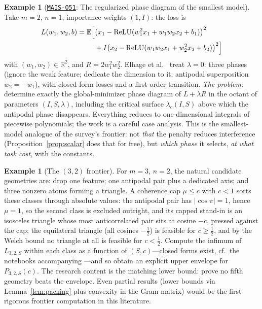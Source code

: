 \documentclass[11pt]{amsart}
\newcommand{\Oid}[1]{\href{https://github.com/lionellevine/MAIS/blob/main/open-problems/MAIS-O#1.md}{\texttt{MAIS-O#1}}}
\theoremstyle{plain}
\theoremstyle{definition}
\newtheorem{example}[theorem]{Example}
\DeclareMathOperator{\relu}{ReLU}
\newcommand{\E}{\mathbb{E}}
\newcommand{\R}{\mathbb{R}}
\begin{document}
\begin{example}[\Oid{51}: The regularized phase diagram of the smallest model]\label{ex:21}
Take $m=2$, $n=1$, importance weights $(1,I)$: the loss is
\begin{align*}
L(w_1,w_2,b) = \E\Bigl[&\bigl(x_1-\relu(w_1^2x_1+w_1w_2x_2+b_1)\bigr)^2\\
&+ I\bigl(x_2-\relu(w_1w_2x_1+w_2^2x_2+b_2)\bigr)^2\Bigr]
\end{align*}
with $(w_1,w_2)\in\R^2$, and $R = 2w_1^2w_2^2$. Elhage et al.~\cite{elhage2022} treat $\lambda=0$: three phases (ignore the weak feature; dedicate the dimension to it; antipodal superposition $w_2=-w_1$), with closed-form losses and a first-order transition. \emph{The problem}: determine exactly the global-minimizer phase diagram of $L+\lambda R$ in the octant of parameters $(I,S,\lambda)$, including the critical surface $\lambda_c(I,S)$ above which the antipodal phase disappears. Everything reduces to one-dimensional integrals of piecewise polynomials; the work is a careful case analysis. This is the smallest-model analogue of the survey's frontier: not \emph{that} the penalty reduces interference (Proposition~\ref{prop:scalar} does that for free), but \emph{which phase} it selects, \emph{at what task cost}, with the constants.
\end{example}

\begin{example}[The $(3,2)$ frontier]
For $m=3$, $n=2$, the natural candidate geometries are: drop one feature; one antipodal pair plus a dedicated axis; and three nonzero atoms forming a triangle. A coherence cap $\mu\le c$ with $c<1$ sorts these classes through absolute values: the antipodal pair has $|\cos\pi|=1$, hence $\mu=1$, so the second class is excluded outright, and its capped stand-in is an isosceles triangle whose most anticorrelated pair sits at cosine $-c$, pressed against the cap; the equilateral triangle (all cosines $-\tfrac12$) is feasible for $c\ge\tfrac12$, and by the Welch bound no triangle at all is feasible for $c<\tfrac12$. Compute the infimum of $L_{3,2,S}$ within each class as a function of $(S,c)$---closed forms exist, cf.\ the notebooks accompanying \cite{elhage2022}---and so obtain an explicit upper envelope for $P_{3,2,S}(c)$. The research content is the matching lower bound: prove no fifth geometry beats the envelope. Even partial results (lower bounds via Lemma~\ref{lem:packing} plus convexity in the Gram matrix) would be the first rigorous frontier computation in this literature.
\end{example}
\end{document}
